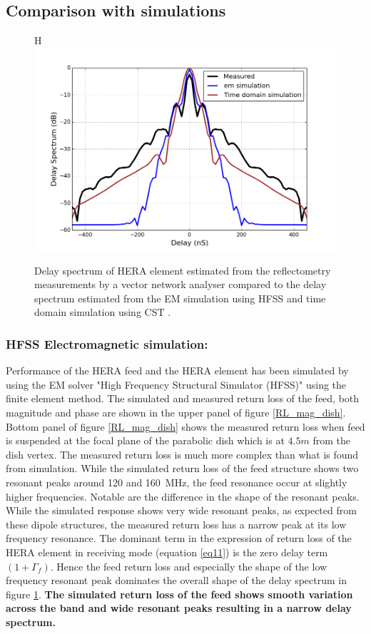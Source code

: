 \documentclass[twocolumn]{emulateapj}
\begin{document}
  \subsection{Comparison with simulations}
  \begin{figure}{H}
  \centering
  \includegraphics[width=\linewidth]{GB_reflectometry_part3/plot/simulation_comparison2.png}
  \caption{Delay spectrum of HERA element estimated from the reflectometry measurements by a vector network analyser compared to the delay spectrum estimated from the EM simulation using HFSS and time domain simulation using CST .}
   \label{fig:sim_em}
   \end{figure}
   
 \subsubsection{HFSS Electromagnetic simulation:}  
 Performance of the HERA feed and the HERA element has been simulated by
    using the EM solver "High Frequency Structural Simulator (HFSS)" using the finite
    element method.  The simulated and measured return loss of the feed, both
    magnitude and phase are shown in the upper panel of figure
    \ref{RL_mag_dish}. Bottom panel of figure \ref{RL_mag_dish} shows the measured return loss when
    feed is suspended at the focal plane of the parabolic dish which is at $4.5m$
    from the dish vertex. The measured return loss is much more complex than what
    is found from simulation. 
    While the simulated return loss of the feed structure shows
    two resonant peaks around 120 and 160~MHz, the feed resonance occur at
    slightly higher frequencies. Notable are the difference in the shape of the
    resonant peaks. While the simulated response shows very wide resonant peaks, as
    expected from these dipole structures, the measured return loss has
    a narrow peak at its low frequency resonance. The dominant term in the expression of  return loss of the HERA element in
    receiving mode (equation \ref{eq11}) is the zero delay term $(1+\Gamma_{f})$. Hence the feed return loss and especially the shape of the low frequency resonant peak dominates the overall shape of the delay spectrum in figure
    \ref{fig:sim_em}. 
 \textbf{The simulated return loss of the feed shows smooth variation across the band and wide resonant peaks resulting in a narrow delay spectrum.}
    
\end{document}
